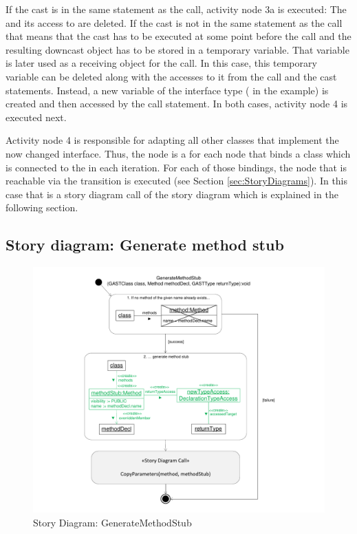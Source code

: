 If the cast is in the same statement as the call, activity node 3a is executed: The  and its access to  are deleted. If the cast is not in the same statement as the call that means that the cast has to be executed at some point before the call and the resulting downcast object has to be stored in a temporary variable. That variable is later used as a receiving object for the call. In this case, this temporary variable can be deleted along with the accesses to it from the call and the cast statements. Instead, a new variable of the interface type ( in the example) is created and then accessed by the call statement. In both cases, activity node 4 is executed next.

Activity node 4 is responsible for adapting all other classes that implement the now changed interface. Thus, the node is a for each node that binds a class which is connected to the  in each iteration. For each of those bindings, the node that is reachable via the  transition is executed (see Section \ref{sec:StoryDiagrams}). In this case that is a story diagram call of the story diagram  which is explained in the following section.

\subsection{Story diagram: Generate method stub}

\begin{figure}[hbtp]
\centering
\includegraphics[width=0.9\linewidth]{./figures/SDGenerateMethodStub}
\caption{Story Diagram: GenerateMethodStub}
\label{fig:SDGenerateMethodStub}
\end{figure}

